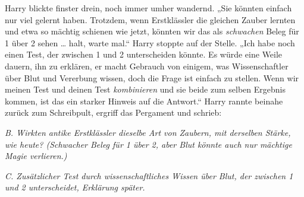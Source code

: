 Harry blickte finster drein, noch immer umher wandernd.
„Sie könnten einfach nur viel gelernt haben. Trotzdem, wenn Erstklässler die gleichen Zauber lernten und etwa so mächtig schienen wie jetzt, könnten wir das als \emph{schwachen} Beleg für 1 über 2 sehen … halt, warte mal.“ Harry stoppte auf der Stelle.
„Ich habe noch einen Test, der zwischen 1 und 2 unterscheiden könnte. Es würde eine Weile dauern, ihn zu erklären, er macht Gebrauch von einigem, was Wissenschaftler über Blut und Vererbung wissen, doch die Frage ist einfach zu stellen. Wenn wir meinen Test und deinen Test \emph{kombinieren} und sie beide zum selben Ergebnis kommen, ist das ein starker Hinweis auf die Antwort.“ Harry rannte beinahe zurück zum Schreibpult, ergriff das Pergament und schrieb:

\emph{B. Wirkten antike Erstklässler dieselbe Art von Zaubern, mit derselben Stärke, wie heute? (Schwacher Beleg für 1 über 2, aber Blut könnte auch nur mächtige Magie verlieren.)}

\emph{C. Zusätzlicher Test durch wissenschaftliches Wissen über Blut, der zwischen 1 und 2 unterscheidet, Erklärung später.}

